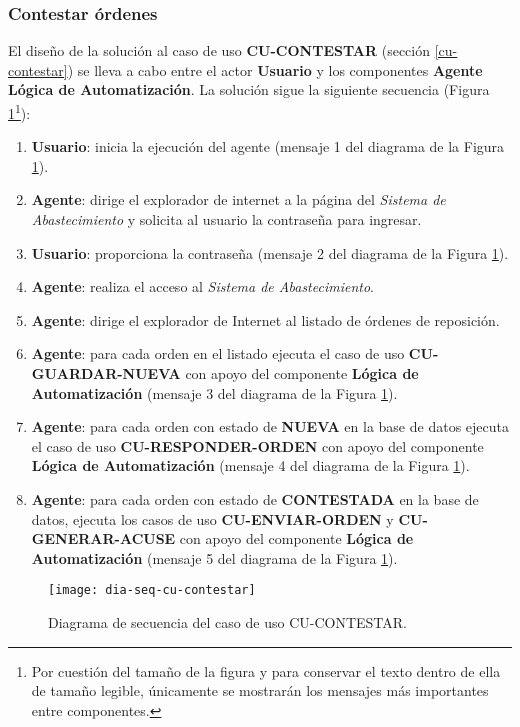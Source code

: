 \subsubsection{Contestar órdenes}
El diseño de la solución al caso de uso \textbf{CU-CONTESTAR} (sección \ref{cu-contestar}) se lleva a cabo entre el actor \textbf{Usuario} y los componentes \textbf{Agente} \textbf{Lógica de Automatización}. La solución sigue la siguiente secuencia (Figura \ref{fig:dia-seq-cu-contestar}\footnote{Por cuestión del tamaño de la figura y para conservar el texto dentro de ella de tamaño legible, únicamente se mostrarán los mensajes más importantes entre componentes.}):
\begin{enumerate}
	\item \textbf{Usuario}: inicia la ejecución del agente (mensaje 1 del diagrama de la Figura \ref{fig:dia-seq-cu-contestar}).
	\item \textbf{Agente}: dirige el explorador de internet a la página del \textit{Sistema de Abastecimiento} y solicita al usuario la contraseña para ingresar.
	\item \textbf{Usuario}: proporciona la contraseña (mensaje 2 del diagrama de la Figura \ref{fig:dia-seq-cu-contestar}).
	\item \textbf{Agente}: realiza el acceso al \textit{Sistema de Abastecimiento}.
	\item \textbf{Agente}: dirige el explorador de Internet al listado de órdenes de reposición.
	\item \textbf{Agente}: para cada orden en el listado ejecuta el caso de uso \textbf{CU-GUARDAR-NUEVA} con apoyo del componente \textbf{Lógica de Automatización} (mensaje 3 del diagrama de la Figura \ref{fig:dia-seq-cu-contestar}).
	\item \textbf{Agente}: para cada orden con estado de \textbf{NUEVA} en la base de datos ejecuta el caso de uso \textbf{CU-RESPONDER-ORDEN} con apoyo del componente \textbf{Lógica de Automatización} (mensaje 4 del diagrama de la Figura \ref{fig:dia-seq-cu-contestar}).
	\item \textbf{Agente}: para cada orden con estado de \textbf{CONTESTADA} en la base de datos, ejecuta los casos de uso \textbf{CU-ENVIAR-ORDEN} y \textbf{CU-GENERAR-ACUSE} con apoyo del componente \textbf{Lógica de Automatización} (mensaje 5 del diagrama de la Figura \ref{fig:dia-seq-cu-contestar}).
\end{enumerate}

\begin{figure}[h]
	\centering
	\texttt{[image: dia-seq-cu-contestar]}
	\caption{Diagrama de secuencia del caso de uso CU-CONTESTAR.}
	\label{fig:dia-seq-cu-contestar}
\end{figure}

